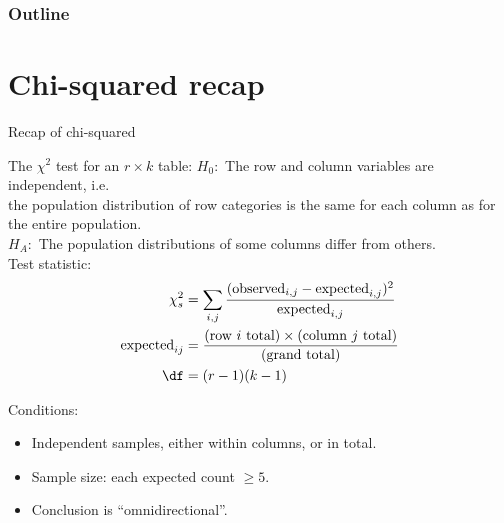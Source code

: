 %
%
%



\subtitle{or, ANOVA}

\date{10 November 2015}




\begin{frame}
  \maketitle
\end{frame}


\begin{frame}\frametitle<presentation>{Outline}
  \tableofcontents
\end{frame}

\section{Chi-squared recap}

\begin{frame}{Recap of chi-squared}
  \begin{block}{The $\chi^2$ test for an $r \times k$ table:}
    $H_0:$ The row and column variables are \alert{independent}, i.e.\\
      the population distribution of row categories is the same for each column 
      as for the entire population.\\
    $H_A:$ The population distributions of some columns differ from others. \\


    \alert{Test statistic:}
    \begin{align*}
      \chi^2_s &= \sum_{i,j} \frac{ (\text{observed}_{i,j} - \text{expected}_{i,j})^2 }{ \text{expected}_{i,j} }  \\
      \text{expected}_{ij} &= \frac{ \text{(row $i$ total)} \times \text{(column $j$ total)} }{ \text{(grand total)} } \\
      \df &= (r-1)(k-1)
    \end{align*}


    \alert{Conditions:} 
    \begin{itemize}
      \item Independent samples, either within columns, or in total.
      \item Sample size: each expected count ${}\ge 5$.
      \item Conclusion is ``omnidirectional''.
    \end{itemize}

  \end{block}
\end{frame}

